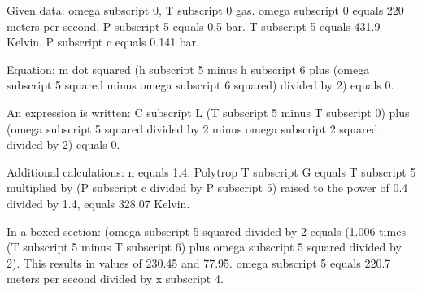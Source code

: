Given data:
omega subscript 0, T subscript 0 gas.
omega subscript 0 equals 220 meters per second.
P subscript 5 equals 0.5 bar.
T subscript 5 equals 431.9 Kelvin.
P subscript c equals 0.141 bar.

Equation:
m dot squared (h subscript 5 minus h subscript 6 plus (omega subscript 5 squared minus omega subscript 6 squared) divided by 2) equals 0.

An expression is written:
C subscript L (T subscript 5 minus T subscript 0) plus (omega subscript 5 squared divided by 2 minus omega subscript 2 squared divided by 2) equals 0.

Additional calculations:
n equals 1.4.
Polytrop T subscript G equals T subscript 5 multiplied by (P subscript c divided by P subscript 5) raised to the power of 0.4 divided by 1.4, equals 328.07 Kelvin.

In a boxed section:
(omega subscript 5 squared divided by 2 equals (1.006 times (T subscript 5 minus T subscript 6) plus omega subscript 5 squared divided by 2). This results in values of 230.45 and 77.95. omega subscript 5 equals 220.7 meters per second divided by x subscript 4.